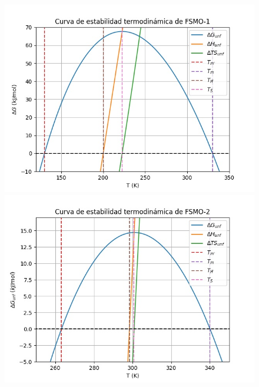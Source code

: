 \documentclass{article}
\begin{document}
    \begin{figure}[h!]
        \centering
        \begin{minipage}[b]{0.45\textwidth}
            \centering
          \includegraphics[scale=0.5]{g1.jpeg}
        \end{minipage}
        \begin{minipage}[b]{0.45\textwidth}
            \centering
          \includegraphics[scale=0.5]{fsmo21.jpeg}
        \end{minipage}
        \begin{minipage}[b]{0.45\textwidth}
            \centering

\end{minipage}
\end{figure}
\end{document}
